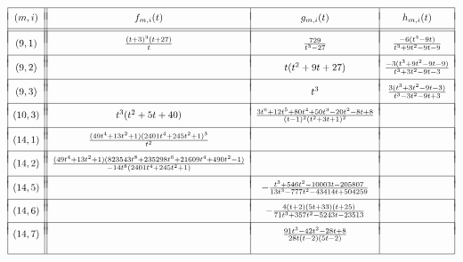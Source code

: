 \begin{table}[!ht]
\[
\begin{array}{|c||c|c|c|} \hline
 & & & \\ [-.75 em]
(m,i) & 
f_{m,i}(t) & 
g_{m,i}(t) & 
h_{m,i}(t) \\
 & & & \\ [-.75 em]
\hline \hline 
& & & \\ [-.75 em]
(9,1) & \frac{(t+3)^3(t+27)}{t} & \frac{729}{t^3-27} &  \frac{-6(t^3 - 9t)}{t^3 + 9t^2 - 9t - 9} \\ 
& & & \\ [-.75 em]
\hline 
& & & \\ [-.75 em]
(9,2) &  & t(t^2 + 9t + 27) & \frac{-3(t^3 + 9t^2 - 9t - 9)}{t^3 + 3t^2 - 9t - 3}  \\
& & & \\ [-.75 em]
\hline 
& & & \\ [-.75 em]
(9,3) &  & t^3 & \frac{3(t^3 + 3t^2 - 9t - 3)}{t^3 - 3t^2 - 9t + 3} \\
& & & \\ [-.75 em]
\hline 
& & & \\ [-.75 em]
(10,3) &  t^3(t^2 + 5t + 40) & \frac{3t^6 + 12t^5 + 80t^4 + 50t^3 - 20t^2 - 8t + 8}{(t-1)^2(t^2 + 3t + 1)^2} & \\
& & & \\ [-.75 em]
\hline 
& & & \\ [-.75 em]
(14,1) &  \frac{(49t^4 + 13t^2 + 1)(2401t^4 + 245t^2 + 1)^3}{t^2} & & \\
& & & \\ [-.75 em]
\hline 
& & & \\ [-.75 em]
(14,2) & \frac{(49t^4 + 13t^2 + 1)(823543t^8 + 235298t^6 + 21609t^4 + 490t^2 - 1)}{-14t^8(2401t^4 + 245t^2 + 1)} &  &  \\
& & & \\ [-.75 em]
\hline
& & & \\ [-.75 em]
(14,5) & & - \frac{t^3 + 546t^2 - 10003t - 205807}{13t^3 - 777t^2 - 43414t + 504259} & \\
& & & \\ [-.75 em]
\hline
& & & \\ [-.75 em]
(14,6) & & - \frac{4(t+2)(5t+33)(t+25)}{71t^3 + 357t^2 - 5243t - 23513} & \\
& & & \\ [-.75 em]
\hline
& & & \\ [-.75 em]
(14,7) & & \frac{91t^3 - 42t^2 - 28t + 8}{28t(t-2)(5t-2)} & \\
& & & \\ 
\hline
\end{array}
\]
\vspace{.1in}
\caption{ Some auxiliary rational functions }
\label{tableofauxiliaryrationalfunctions}
\end{table}
